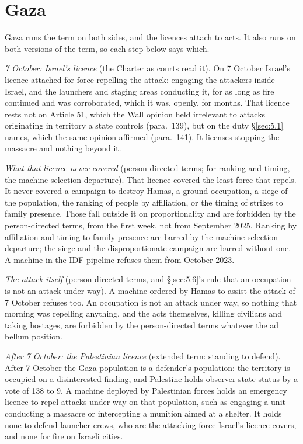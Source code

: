 \section{Gaza}
\label{sec:5.8}
Gaza runs the term on both sides, and the licences attach to acts. It also runs on both versions of the term, so each step below says which.

\emph{7 October: Israel's licence} (the Charter as courts read it). On 7 October Israel's licence attached for force repelling the attack: engaging the attackers inside Israel, and the launchers and staging areas conducting it, for as long as fire continued and was corroborated, which it was, openly, for months. That licence rests not on Article 51, which the Wall opinion held irrelevant to attacks originating in territory a state controls (para.~139), but on the duty \S\ref{sec:5.1} names, which the same opinion affirmed (para.~141). It licenses stopping the massacre and nothing beyond it.

\emph{What that licence never covered} (person-directed terms; for ranking and timing, the machine-selection departure). That licence covered the least force that repels. It never covered a campaign to destroy Hamas, a ground occupation, a siege of the population, the ranking of people by affiliation, or the timing of strikes to family presence. Those fall outside it on proportionality and are forbidden by the person-directed terms, from the first week, not from September 2025. Ranking by affiliation and timing to family presence are barred by the machine-selection departure; the siege and the disproportionate campaign are barred without one. A machine in the IDF pipeline refuses them from October 2023.

\emph{The attack itself} (person-directed terms, and \S\ref{sec:5.6}'s rule that an occupation is not an attack under way). A machine ordered by Hamas to assist the attack of 7 October refuses too. An occupation is not an attack under way, so nothing that morning was repelling anything, and the acts themselves, killing civilians and taking hostages, are forbidden by the person-directed terms whatever the ad bellum position.

\emph{After 7 October: the Palestinian licence} (extended term: standing to defend). After 7 October the Gaza population is a defender's population: the territory is occupied on a disinterested finding, and Palestine holds observer-state status by a vote of 138 to 9. A machine deployed by Palestinian forces holds an emergency licence to repel attacks under way on that population, such as engaging a unit conducting a massacre or intercepting a munition aimed at a shelter. It holds none to defend launcher crews, who are the attacking force Israel's licence covers, and none for fire on Israeli cities.

